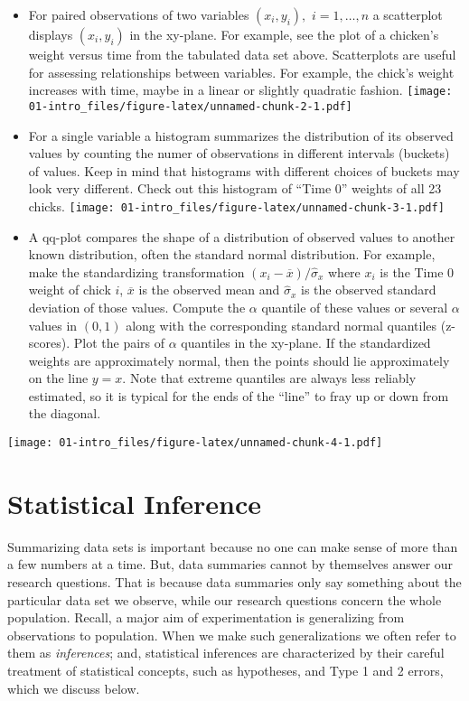 \documentclass[
]{book}
\theoremstyle{definition}
\theoremstyle{definition}
\theoremstyle{definition}
\theoremstyle{definition}
\theoremstyle{remark}
\begin{document}
\begin{itemize}
\item
  For paired observations of two variables \((x_i, y_i), \,\,i = 1, \ldots, n\) a scatterplot displays \((x_i, y_i)\) in the xy-plane. For example, see the plot of a chicken's weight versus time from the tabulated data set above. Scatterplots are useful for assessing relationships between variables. For example, the chick's weight increases with time, maybe in a linear or slightly quadratic fashion.
  \texttt{[image: 01-intro\_files/figure-latex/unnamed-chunk-2-1.pdf]}
\item
  For a single variable a histogram summarizes the distribution of its observed values by counting the numer of observations in different intervals (buckets) of values. Keep in mind that histograms with different choices of buckets may look very different. Check out this histogram of ``Time 0'' weights of all 23 chicks.
  \texttt{[image: 01-intro\_files/figure-latex/unnamed-chunk-3-1.pdf]}
\item
  A qq-plot compares the shape of a distribution of observed values to another known distribution, often the standard normal distribution. For example, make the standardizing transformation \((x_i - \overline x) / \hat\sigma_x\) where \(x_i\) is the Time 0 weight of chick \(i\), \(\overline x\) is the observed mean and \(\hat\sigma_x\) is the observed standard deviation of those values. Compute the \(\alpha\) quantile of these values or several \(\alpha\) values in \((0,1)\) along with the corresponding standard normal quantiles (z-scores). Plot the pairs of \(\alpha\) quantiles in the xy-plane. If the standardized weights are approximately normal, then the points should lie approximately on the line \(y=x\). Note that extreme quantiles are always less reliably estimated, so it is typical for the ends of the ``line'' to fray up or down from the diagonal.
\end{itemize}

\texttt{[image: 01-intro\_files/figure-latex/unnamed-chunk-4-1.pdf]}

\hypertarget{statistical-inference}{%
\section{Statistical Inference}\label{statistical-inference}}

Summarizing data sets is important because no one can make sense of more than a few numbers at a time. But, data summaries cannot by themselves answer our research questions. That is because data summaries only say something about the particular data set we observe, while our research questions concern the whole population. Recall, a major aim of experimentation is generalizing from observations to population. When we make such generalizations we often refer to them as \emph{inferences}; and, statistical inferences are characterized by their careful treatment of statistical concepts, such as hypotheses, and Type 1 and 2 errors, which we discuss below.
\end{document}
